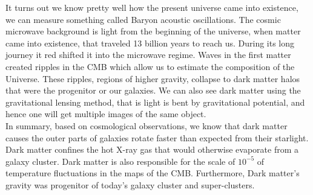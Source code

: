 \documentclass[11pt]{article}
\theoremstyle{break}
\theoremstyle{break}
\begin{document}
It turns out we know pretty well how the present universe came into existence, we can measure something called Baryon acoustic oscillations. The cosmic microwave background is light from the beginning of the universe, when matter came into existence, that traveled 13 billion years to reach us. During its long journey it red shifted it into the microwave regime. Waves in the first matter created ripples in the CMB which allow us to estimate the composition of the Universe. These ripples, regions of higher gravity, collapse to dark matter halos that were the progenitor or our galaxies. We can also see dark matter using the gravitational lensing method, that is light is bent by gravitational potential, and hence one will get multiple images of the same object. \\

In summary, based on cosmological observations, we know that dark matter causes the outer parts of galaxies rotate faster than expected from their starlight. Dark matter confines the hot X-ray gas that would otherwise evaporate from a galaxy cluster. Dark matter is also responsible for the scale of $10^{-5}$ of temperature fluctuations in the maps of the CMB. Furthermore, Dark matter's gravity was progenitor of today's galaxy cluster and super-clusters.\\
\end{document}
